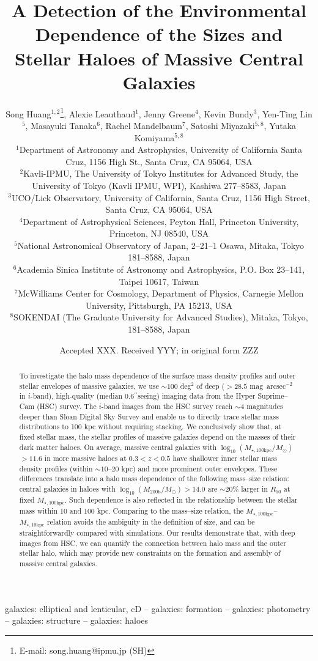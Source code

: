 \documentclass[a4paper,fleqn,usenatbib]{mnras}
\title[Structure and Environment of Massive Galaxies]{
       A Detection of the Environmental Dependence of the Sizes and Stellar Haloes
       of Massive Central Galaxies}
\author[S. Huang et al.]{
        Song Huang$^{1,2}$\thanks{E-mail: song.huang@ipmu.jp (SH)},
        Alexie Leauthaud$^{1}$,
        Jenny Greene$^{4}$,
        Kevin Bundy$^{3}$,
        \newauthor
        Yen-Ting Lin$^{5}$,
        Masayuki Tanaka$^{6}$,
        Rachel Mandelbaum$^{7}$,
        Satoshi Miyazaki$^{5,8}$,
        \newauthor
        Yutaka Komiyama$^{5,8}$
        \\
        $^{1}$Department of Astronomy and Astrophysics, University of California 
              Santa Cruz, 1156 High St., Santa Cruz, CA 95064, USA\\
        $^{2}$Kavli-IPMU, The University of Tokyo Institutes for Advanced Study, 
              the University of Tokyo (Kavli IPMU, WPI), Kashiwa 277--8583, Japan\\              
        $^{3}$UCO/Lick Observatory, University of California, Santa Cruz,
              1156 High Street, Santa Cruz, CA 95064, USA\\
        $^{4}$Department of Astrophysical Sciences, Peyton Hall,
              Princeton University, Princeton, NJ 08540, USA \\
        $^{5}$National Astronomical Observatory of Japan, 2--21--1 Osawa, Mitaka, 
              Tokyo 181--8588, Japan\\
        $^{6}$Academia Sinica Institute of Astronomy and Astrophysics, 
              P.O. Box 23--141, Taipei 10617, Taiwan\\
        $^{7}$McWilliams Center for Cosmology, Department of Physics, 
              Carnegie Mellon University, Pittsburgh, PA 15213, USA\\
        $^{8}$SOKENDAI (The Graduate University for Advanced Studies), Mitaka,
              Tokyo, 181--8588, Japan
        }
\date{Accepted XXX. Received YYY; in original form ZZZ}
\def\asec{$^{\prime\prime}$}
\def\sb{mag~arcsec$^{-2}$}
\def\logmh{{$\log_{10} (M_{\mathrm{200b}}/M_{\odot})$}}
\def\minn{{$M_{\star,10\mathrm{kpc}}$}}
\def\mtot{{$M_{\star,100\mathrm{kpc}}$}}
\def\logmtot{{$\log_{10} (M_{\star,100\mathrm{kpc}}/M_{\odot})$}}
\begin{document}
\label{firstpage}
\pagerange{\pageref{firstpage}--\pageref{lastpage}}

\maketitle


\begin{abstract}  

    To investigate the halo mass dependence of the surface mass density profiles 
    and outer stellar envelopes of massive galaxies, we use ${\sim}100$ deg$^2$ of 
    deep ($>28.5$ \sb{} in $i$-band), high-quality 
    (median 0.6\asec seeing) imaging data from the Hyper Suprime--Cam (HSC) survey.
    The $i$-band images from the HSC survey reach ${\sim}4$ magnitudes deeper than 
    Sloan Digital Sky Survey and enable us to directly trace stellar mass distributions 
    to 100 kpc without requiring stacking.  
    We conclusively show that, at fixed stellar mass, the stellar profiles of massive 
    galaxies depend on the masses of their dark matter haloes. 
    On average, massive central galaxies with \logmtot{}$>11.6$ in more massive haloes 
    at $0.3 < z < 0.5$ have shallower inner stellar mass density profiles 
    (within ${\sim}10$--$20$ kpc) and more prominent outer envelopes. 
    These differences translate into a halo mass dependence of the 
    following mass--size relation: central galaxies in haloes with \logmh{}$>14.0$ are 
    $\sim 20$\% larger in $R_{\mathrm{50}}$ at fixed \mtot{}.  
    Such dependence is also reflected in the relationship between the stellar mass 
    within 10 and 100 kpc. 
    Comparing to the mass--size relation, the \mtot{}--\minn{} relation avoids the 
    ambiguity in the definition of size, and can be straightforwardly compared with 
    simulations. 
    Our results demonstrate that, with deep images from HSC, we can quantify the 
    connection between halo mass and the outer stellar halo, which may provide new 
    constraints on the formation and assembly of massive central galaxies.
    
\end{abstract}

\begin{keywords}
    galaxies: elliptical and lenticular, cD --
    galaxies: formation --
    galaxies: photometry -- 
    galaxies: structure -- 
    galaxies: haloes
\end{keywords}
\end{document}
